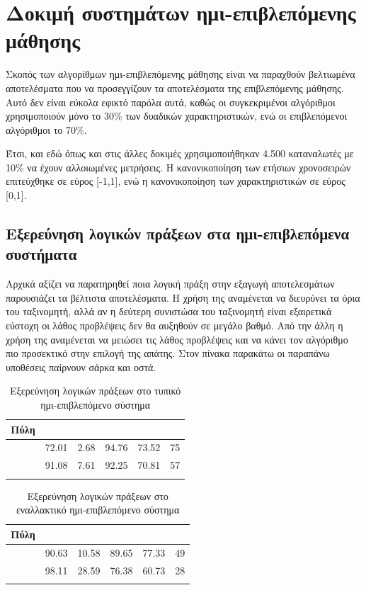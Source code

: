 \section{Δοκιμή συστημάτων ημι-επιβλεπόμενης μάθησης}
Σκοπός των αλγορίθμων ημι-επιβλεπόμενης μάθησης είναι να παραχθούν βελτιωμένα αποτελέσματα που να προσεγγίζουν τα αποτελέσματα της επιβλεπόμενης μάθησης. Αυτό δεν είναι εύκολα εφικτό παρόλα αυτά, καθώς οι συγκεκριμένοι αλγόριθμοι χρησιμοποιούν μόνο το 30\% των δυαδικών χαρακτηριστικών, ενώ οι επιβλεπόμενοι αλγόριθμοι το 70\%.\par
Έτσι, και εδώ όπως και στις άλλες δοκιμές χρησιμοποιήθηκαν 4.500 καταναλωτές με 10\% να έχουν αλλοιωμένες μετρήσεις.  Η κανονικοποίηση των ετήσιων χρονοσειρών επιτεύχθηκε σε εύρος [-1,1], ενώ η κανονικοποίηση των χαρακτηριστικών σε εύρος [0,1].
\subsection{Εξερεύνηση λογικών πράξεων στα ημι-επιβλεπόμενα συστήματα}
Αρχικά αξίζει να παρατηρηθεί ποια λογική πράξη στην εξαγωγή αποτελεσμάτων παρουσιάζει τα βέλτιστα αποτελέσματα. Η χρήση της  αναμένεται να διευρύνει τα όρια του ταξινομητή, αλλά αν η δεύτερη συνιστώσα του ταξινομητή είναι εξαιρετικά εύστοχη οι λάθος προβλέψεις δεν θα αυξηθούν σε μεγάλο βαθμό. Από την άλλη η χρήση της  αναμένεται να μειώσει τις λάθος προβλέψεις και να κάνει τον αλγόριθμο πιο προσεκτικό στην επιλογή της απάτης. Στον πίνακα παρακάτω οι παραπάνω υποθέσεις παίρνουν σάρκα και οστά.
\begin{center}
\begin{longtabu} to 0.8\textwidth { | X[c] || X[c] | X[c] | X[c] | X[c] | X[c] |  }
 \hline
 Πύλη &   &  &  &  & \\
\hline
  & 72.01 & 2.68 & 94.76 & 73.52 & 75\\
 \hline
 & 91.08 & 7.61 &  92.25 & 70.81 & 57\\ 
\hline
\caption{Εξερεύνηση λογικών πράξεων στο τυπικό ημι-επιβλεπόμενο σύστημα}
\label{tab:testlogicopersemisup1}
\end{longtabu}
\end{center}

\begin{center}
\begin{longtabu} to 0.8\textwidth { | X[c] || X[c] | X[c] | X[c] | X[c] | X[c] |  }
 \hline
 Πύλη &   &  &  &  & \\
\hline
  & 90.63 & 10.58 & 89.65 & 77.33 & 49\\
 \hline
 & 98.11 & 28.59 & 76.38 & 60.73 & 28\\ 
\hline
\caption{Εξερεύνηση λογικών πράξεων στο εναλλακτικό ημι-επιβλεπόμενο σύστημα}
\label{tab:testlogicopersemisup2}
\end{longtabu}
\end{center}

